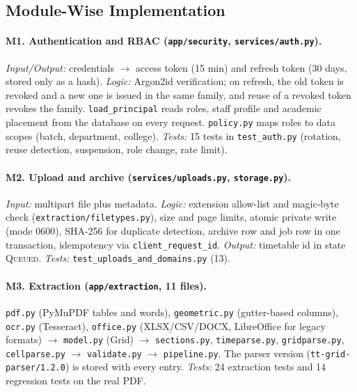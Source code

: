 \subsection{Module-Wise Implementation}
\paragraph{M1. Authentication and RBAC (\texttt{app/security}, \texttt{services/auth.py}).}
\emph{Input/Output:} credentials $\rightarrow$ access token (15 min) and refresh token (30 days, stored only as a hash).
\emph{Logic:} Argon2id verification; on refresh, the old token is revoked and a new one is issued in
the same family, and reuse of a revoked token revokes the family. \texttt{load\_principal} reads roles,
staff profile and academic placement from the database on every request. \texttt{policy.py} maps
roles to data scopes (batch, department, college).
\emph{Tests:} 15 tests in \texttt{test\_auth.py} (rotation, reuse detection, suspension, role change, rate limit).

\paragraph{M2. Upload and archive (\texttt{services/uploads.py}, \texttt{storage.py}).}
\emph{Input:} multipart file plus metadata. \emph{Logic:} extension allow-list and magic-byte
check (\texttt{extraction/filetypes.py}), size and page limits, atomic private write (mode 0600),
SHA-256 for duplicate detection, archive row and job row in one transaction, idempotency via
\texttt{client\_request\_id}. \emph{Output:} timetable id in state \textsc{Queued}.
\emph{Tests:} \texttt{test\_uploads\_and\_domains.py} (13).

\paragraph{M3. Extraction (\texttt{app/extraction}, 11 files).}
\texttt{pdf.py} (PyMuPDF tables and words), \texttt{geometric.py} (gutter-based columns),
\texttt{ocr.py} (Tesseract), \texttt{office.py} (XLSX/CSV/DOCX, LibreOffice for legacy formats)
$\rightarrow$ \texttt{model.py} (Grid) $\rightarrow$ \texttt{sections.py}, \texttt{timeparse.py},
\texttt{gridparse.py}, \texttt{cellparse.py} $\rightarrow$ \texttt{validate.py} $\rightarrow$
\texttt{pipeline.py}. The parser version (\texttt{tt-grid-parser/1.2.0}) is stored with every entry.
\emph{Tests:} 24 extraction tests and 14 regression tests on the real PDF.

